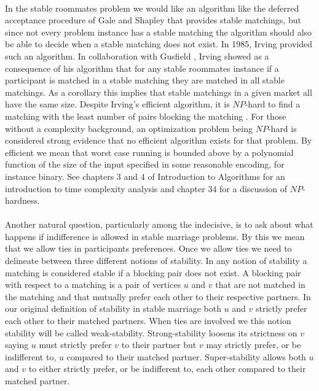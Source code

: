 \paragraph{}
In the stable roommates problem we would like an algorithm like the deferred acceptance procedure of Gale and Shapley that provides stable matchings, but since not every problem instance has a stable matching the algorithm should also be able to decide when a stable matching does not exist. In 1985, Irving \cite{irving1985efficient} provided such an algorithm. In collaboration with Gusfield \cite{irving1987efficient}, Irving showed as a consequence of his algorithm that for any stable roommates instance if a participant is matched in a stable matching they are matched in all stable matchings. As a corollary this implies that stable matchings in a given market all have the same size. Despite Irving's efficient algorithm, it is $NP$-hard to find a matching with the least number of pairs blocking the matching \cite{abraham2005almost}. For those without a complexity background, an optimization problem being $NP$-hard is considered strong evidence that no efficient algorithm exists for that problem. By efficient we mean that worst case running is bounded above by a polynomial function of the size of the input specified in some reasonable encoding, for instance binary. See chapters $3$ and $4$ of Introduction to Algorithms \cite{cormen2009introduction} for an introduction to time complexity analysis and chapter $34$ for a discussion of $NP$-hardness.
\paragraph{}
Another natural question, particularly among the indecisive, is to ask about what happens if indifference is allowed in stable marriage problems. By this we mean that we allow ties in participants preferences. Once we allow ties we need to delineate between three different notions of stability. In any notion of stability a matching is considered stable if a blocking pair does not exist. A blocking pair with respect to a matching is a pair of vertices $u$ and $v$ that are not matched in the matching and that mutually prefer each other to their respective partners. In our original definition of stability in stable marriage both $u$ and $v$ strictly prefer each other to their matched partners. When ties are involved we this notion stability will be called weak-stability. Strong-stability loosens its strictness on $v$ saying $u$ must strictly prefer $v$ to their partner but $v$ may strictly prefer, or be indifferent to, $u$ compared to their matched partner. Super-stability allows both $u$ and $v$ to either strictly prefer, or be indifferent to, each other compared to their matched partner.
